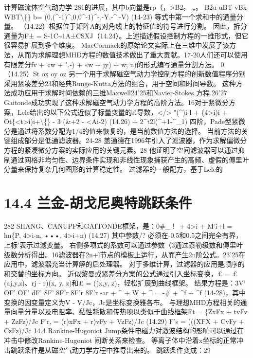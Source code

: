 \documentclass[UTF8,11pt,a4paper,openany,fontset=fandol]{ctexbook}
\begin{document}
计算磁流体空气动力学 281的进展，其中b向量是rp（，>B2。 „。 B2u uBT vBx WBT\textbackslash\{\} b= (0,(\textasciicircum{}-1)\textasciicircum{},0,0\textasciicircum{}-1)\textasciicircum{}-,-Y.-\textasciicircum{}.-V) (14-23) 等式中第一个求和中的通量分量。 （14.22）根据位于矩阵A的对角线上的特征值的符号进行分割。 因此，拆分通量为F± = S-1C\textasciitilde{}1A±CSXJ（14.24）。上述描述假设控制方程的一维形式，但它很容易扩展到多个维度。 MacCormack的原始论文实际上在三维中发展了该方法，从而为求解理想MHD方程的数值技术做出了重大贡献。17-20人们还可以使用有限差分fv + «w + ".-) + «w + jy) + w; n)的形式编写通量分割方法。 0（14.25）St ox oy oz 另一个用于求解磁空气动力学控制方程的创新数值程序分别采用紧凑差分23和经典Runge-Kutta方法的组合，用于空间和时间导数。 这种方法成功应用于求解时间依赖的三维Maxwell24'25和Navier-Stokes 方程.26'27 Gaitonde成功实现了这种求解磁空气动力学方程的高阶方法。16对于紧微分方案，Lele给出的以下公式近似了标量变量的£导数，</> "(\textasciicircum{})i-l + \{4>i)i + Ot\{<t>i)i+\textbackslash\{\} - 3 (\&+2 - <Ai-2) (14.26) + 2\textasciicircum{}t2l(\textasciicircum{}+1-\textasciicircum{}\_1) 四阶，Pade型紧微分是通过将系数分配为1/4的值来恢复的，是当前数值方法的选择。 当前方法的关键组成部分是低通滤波器。24-28 盖通德在1996年引入了滤波器，作为求解偏微分方程的紧凑微分方案的实际应用的关键元素。28 他证明了空间滤波器可以通过抑制通过网格非均匀性、边界条件实现和非线性现象捕获产生的高频、虚假的傅里叶分量来保持复杂几何图形的计算稳定性。 过滤器的一般配方，基于Lele的

\section{14.4 兰金-胡戈尼奥特跳跃条件}
282 SHANG、CANUPP和GAITONDE框架，是：0\#\_！ + 4>i + M'i+l = hn\{P, 4>i-n, •••, 4>i+n) (14.27) 其中参数/? 必须在-0.5和0.5之间完全有界，上标'表示过滤变量。 右侧多项式的系数可以通过参数（3通过泰勒级数和傅里叶级数分析得出。16滤波器在2n+l节点的模板上运行，从而产生2n阶公式。23'25在应用中，滤波器充当计算解的后处理器。 对于多维计算，过滤器的应用是顺序的和交替的坐标方向。 近似黎曼或紧差分方案的公式通过引入坐标变换，£ = £(aj,y,z)、rj - r)(x, y, z)和£ = ((x,y, z)，轻松扩展到曲线框架。 结果方程是：3V' OF' OF' dF' 8F' 8F'r 8F'r 8F'r -ar + \textasciicircum{} + W + \textasciicircum{} = -\# + \textasciicircum{}f + \textasciicircum{}f (14-28)，其中变换的因变量定义为V - V/Jc，Jc是坐标变换雅各布。 与理想MHD方程相关的通量向量分量以及电阻率、黏性耗散和传热项以类似于曲线框架Ft = \{ZxFx + tvFv + ZzFz)/Jc F'r, = (r)xFx + r)vFy + VzFz)/Jc (14.29) F's = (((XFX + CvFy + CzFz)/Jc 14.4 Rankine-Hugoniot Jump条件电磁力对激波结构的影响可以通过在冲击中修改Rankine-Hugoniot 间断关系来检查。 等离子体中沿着x坐标的正常冲击跳跃条件是从磁空气动力学方程中推导出来的。 跳跃条件变成：29
\end{document}
